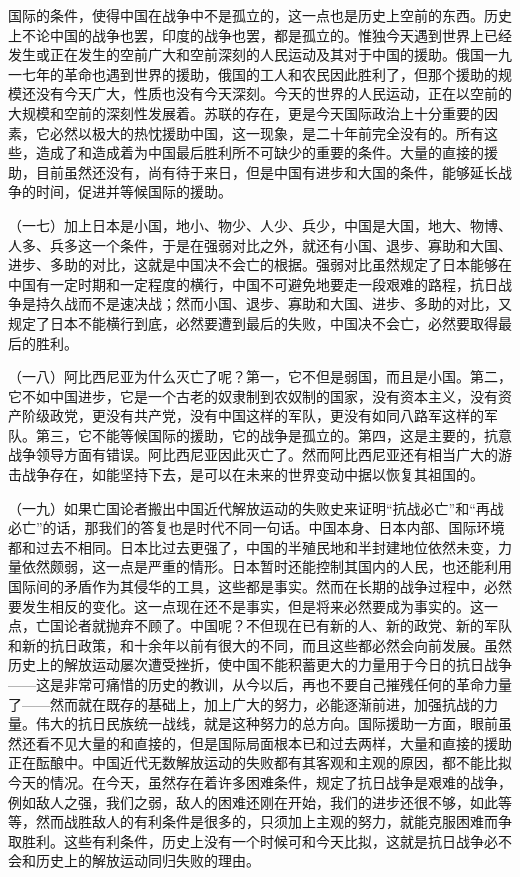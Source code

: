 国际的条件，使得中国在战争中不是孤立的，这一点也是历史上空前的东西。历史上不论中国的战争也罢，印度的战争也罢，都是孤立的。惟独今天遇到世界上已经发生或正在发生的空前广大和空前深刻的人民运动及其对于中国的援助。俄国一九一七年的革命也遇到世界的援助，俄国的工人和农民因此胜利了，但那个援助的规模还没有今天广大，性质也没有今天深刻。今天的世界的人民运动，正在以空前的大规模和空前的深刻性发展着。苏联的存在，更是今天国际政治上十分重要的因素，它必然以极大的热忱援助中国，这一现象，是二十年前完全没有的。所有这些，造成了和造成着为中国最后胜利所不可缺少的重要的条件。大量的直接的援助，目前虽然还没有，尚有待于来日，但是中国有进步和大国的条件，能够延长战争的时间，促进并等候国际的援助。

（一七）加上日本是小国，地小、物少、人少、兵少，中国是大国，地大、物博、人多、兵多这一个条件，于是在强弱对比之外，就还有小国、退步、寡助和大国、进步、多助的对比，这就是中国决不会亡的根据。强弱对比虽然规定了日本能够在中国有一定时期和一定程度的横行，中国不可避免地要走一段艰难的路程，抗日战争是持久战而不是速决战；然而小国、退步、寡助和大国、进步、多助的对比，又规定了日本不能横行到底，必然要遭到最后的失败，中国决不会亡，必然要取得最后的胜利。

（一八）阿比西尼亚为什么灭亡了呢？第一，它不但是弱国，而且是小国。第二，它不如中国进步，它是一个古老的奴隶制到农奴制的国家，没有资本主义，没有资产阶级政党，更没有共产党，没有中国这样的军队，更没有如同八路军这样的军队。第三，它不能等候国际的援助，它的战争是孤立的。第四，这是主要的，抗意战争领导方面有错误。阿比西尼亚因此灭亡了。然而阿比西尼亚还有相当广大的游击战争存在，如能坚持下去，是可以在未来的世界变动中据以恢复其祖国的。

（一九）如果亡国论者搬出中国近代解放运动的失败史来证明“抗战必亡”和“再战必亡”的话，那我们的答复也是时代不同一句话。中国本身、日本内部、国际环境都和过去不相同。日本比过去更强了，中国的半殖民地和半封建地位依然未变，力量依然颇弱，这一点是严重的情形。日本暂时还能控制其国内的人民，也还能利用国际间的矛盾作为其侵华的工具，这些都是事实。然而在长期的战争过程中，必然要发生相反的变化。这一点现在还不是事实，但是将来必然要成为事实的。这一点，亡国论者就抛弃不顾了。中国呢？不但现在已有新的人、新的政党、新的军队和新的抗日政策，和十余年以前有很大的不同，而且这些都必然会向前发展。虽然历史上的解放运动屡次遭受挫折，使中国不能积蓄更大的力量用于今日的抗日战争——这是非常可痛惜的历史的教训，从今以后，再也不要自己摧残任何的革命力量了——然而就在既存的基础上，加上广大的努力，必能逐渐前进，加强抗战的力量。伟大的抗日民族统一战线，就是这种努力的总方向。国际援助一方面，眼前虽然还看不见大量的和直接的，但是国际局面根本已和过去两样，大量和直接的援助正在酝酿中。中国近代无数解放运动的失败都有其客观和主观的原因，都不能比拟今天的情况。在今天，虽然存在着许多困难条件，规定了抗日战争是艰难的战争，例如敌人之强，我们之弱，敌人的困难还刚在开始，我们的进步还很不够，如此等等，然而战胜敌人的有利条件是很多的，只须加上主观的努力，就能克服困难而争取胜利。这些有利条件，历史上没有一个时候可和今天比拟，这就是抗日战争必不会和历史上的解放运动同归失败的理由。

